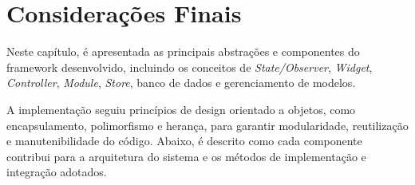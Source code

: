 \section{Considerações Finais}
\label{sec:3:consideracoes-finais}

\newcommand\urlKmeansSolver{https://github.com/ZauJulio/FeaturesAnalyzer/blob/test/src/context/states/kmeans\_solver.py}

Neste capítulo, é apresentada as principais abstrações e componentes do framework desenvolvido, incluindo os conceitos de \textit{State/Observer}, \textit{Widget}, \textit{Controller}, \textit{Module}, \textit{Store}, banco de dados e gerenciamento de modelos.

A implementação seguiu princípios de design orientado a objetos, como encapsulamento, polimorfismo e herança, para garantir modularidade, reutilização e manutenibilidade do código. Abaixo, é descrito como cada componente contribui para a arquitetura do sistema e os métodos de implementação e integração adotados.

